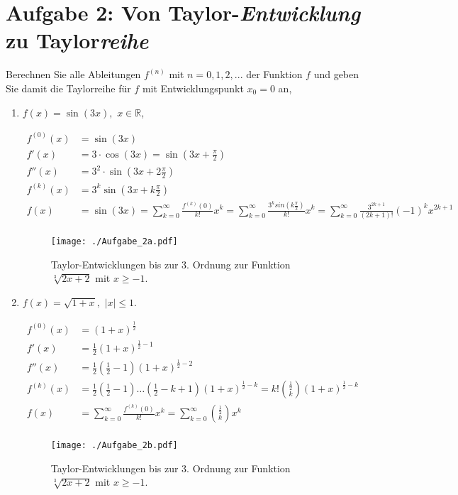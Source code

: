 \documentclass[11pt,a4paper, parskip=half ]{report}
\begin{document}
  \section*{Aufgabe 2: Von Taylor-\textit{Entwicklung} zu Taylor\textit{reihe}}
  Berechnen Sie alle Ableitungen $f^{(n)}$ mit $n = 0, 1, 2, ...$ der Funktion $f$ und geben Sie damit die Taylorreihe für $f$ mit Entwicklungspunkt $x_0 = 0$ an,  
  \begin{enumerate}
    \item $f(x) = \sin(3x), \,\, x \in \mathbb{R}$, 
    
    \vspace{20pt}
    \begin{align*}
    f^{(0)}(x) &= \sin(3x) \\
    f'(x) &= 3 \cdot \cos(3x) = \sin(3x + \frac{\pi}{2}) \\
    f''(x) &= 3^2 \cdot \sin(3x + 2 \frac{\pi}{2}) \\
    f^{(k)}(x) &= 3^k \sin(3x + k \frac{\pi}{2}) \\
    f(x) &= \sin(3x) = \sum_{k = 0}^{\infty} \frac{f^{(k)}(0)}{k!} x^k = \sum_{k = 0}^{\infty} \frac{3^k sin(k \frac{\pi}{2})}{k!} x^k = \sum_{k = 0}^{\infty} \frac{3^{2k+1}}{(2k+1)!} (-1)^k x^{2k+1} \\
    \end{align*}

    \begin{figure}
      \centering
      \texttt{[image: ./Aufgabe\_2a.pdf]}
      \caption{Taylor-Entwicklungen bis zur 3. Ordnung zur Funktion $\sqrt[3]{2x+2}$ mit $x\geq -1$.}
      \label{fig:feynman2}
    \end{figure}

    \item $f(x) = \sqrt{1+x}, \,\,|x| \leq 1$.
    
    \vspace{20pt}
    \begin{align*}
    f^{(0)}(x) &= (1+x)^{\frac{1}{2}} \\
    f'(x) &= \frac{1}{2} (1+x)^{\frac{1}{2} -1} \\
    f''(x) &= \frac{1}{2} \left(\frac{1}{2} -1\right) (1+x)^{\frac{1}{2} -2} \\
    f^{(k)}(x) &= \frac{1}{2} \left(\frac{1}{2} -1\right) \dots \left(\frac{1}{2} - k + 1\right) (1+x)^{\frac{1}{2} - k} = k! {\frac{1}{2}\choose k} (1 + x)^{\frac{1}{2} - k}\\
    f(x) &= \sum_{k=0}^{\infty} \frac{f^{(k)}(0)}{k!} x^k = \sum_{k=0}^{\infty} {\frac{1}{2}\choose k} x^k \\
    \end{align*}

    \begin{figure}
      \centering
      \texttt{[image: ./Aufgabe\_2b.pdf]}
      \caption{Taylor-Entwicklungen bis zur 3. Ordnung zur Funktion $\sqrt[3]{2x+2}$ mit $x\geq -1$.}
      \label{fig:feynman2}
    \end{figure}

  \end{enumerate}
\end{document}
